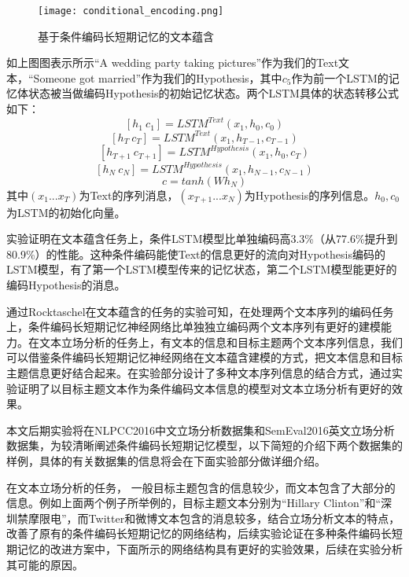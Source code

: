 \begin{figure}[htbp]
	\centering
	\texttt{[image: conditional\_encoding.png]}
	\caption[rnn_vanish]{基于条件编码长短期记忆的文本蕴含}
\end{figure}

如上图图表示所示“A wedding party taking pictures”作为我们的Text文本，“Someone got married”作为我们的Hypothesis，其中$c_5$作为前一个LSTM的记忆体状态被当做编码Hypothesis的初始记忆状态。两个LSTM具体的状态转移公式如下：
\begin{equation}\label{lstm_f}[h_1~c_1] = LSTM^{Text}(x_1,h_0,c_0)\end{equation}
\begin{equation}\label{lstm_f}[h_T~c_T] = LSTM^{Text}(x_1,h_{T-1},c_{T-1})\end{equation}
\begin{equation}\label{lstm_f}[h_{T+1}~c_{T+1}] = LSTM^{Hypothesis}(x_1,h_0,c_T)\end{equation}
\begin{equation}\label{lstm_f}[h_{N}~c_{N}] = LSTM^{Hypothesis}(x_1,h_{N-1},c_{N-1})\end{equation}
\begin{equation}\label{lstm_f}c=tanh(Wh_N)\end{equation}
其中$(x_1...x_T)$为Text的序列消息，$(x_{T+1}...x_N)$为Hypothesis的序列信息。$h_0,c_0$为LSTM的初始化向量。

实验证明在文本蕴含任务上，条件LSTM模型比单独编码高3.3\%（从77.6\%提升到80.9\%）的性能。这种条件编码能使Text的信息更好的流向对Hypothesis编码的LSTM模型，有了第一个LSTM模型传来的记忆状态，第二个LSTM模型能更好的编码Hypothesis的消息。


通过Rocktaschel在文本蕴含的任务的实验可知，在处理两个文本序列的编码任务上，条件编码长短期记忆神经网络比单独独立编码两个文本序列有更好的建模能力。在文本立场分析的任务上，有文本的信息和目标主题两个文本序列信息，我们可以借鉴条件编码长短期记忆神经网络在文本蕴含建模的方式，把文本信息和目标主题信息更好结合起来。在实验部分设计了多种文本序列信息的结合方式，通过实验证明了以目标主题文本作为条件编码文本信息的模型对文本立场分析有更好的效果。

本文后期实验将在NLPCC2016中文立场分析数据集和SemEval2016英文立场分析数据集，为较清晰阐述条件编码长短期记忆模型，以下简短的介绍下两个数据集的样例，具体的有关数据集的信息将会在下面实验部分做详细介绍。

在文本立场分析的任务， 一般目标主题包含的信息较少，而文本包含了大部分的信息。例如上面两个例子所举例的，目标主题文本分别为“Hillary Clinton”和“深圳禁摩限电”，而Twitter和微博文本包含的消息较多，结合立场分析文本的特点，改善了原有的条件编码长短期记忆的网络结构，后续实验论证在多种条件编码长短期记忆的改进方案中，下面所示的网络结构具有更好的实验效果，后续在实验分析其可能的原因。

